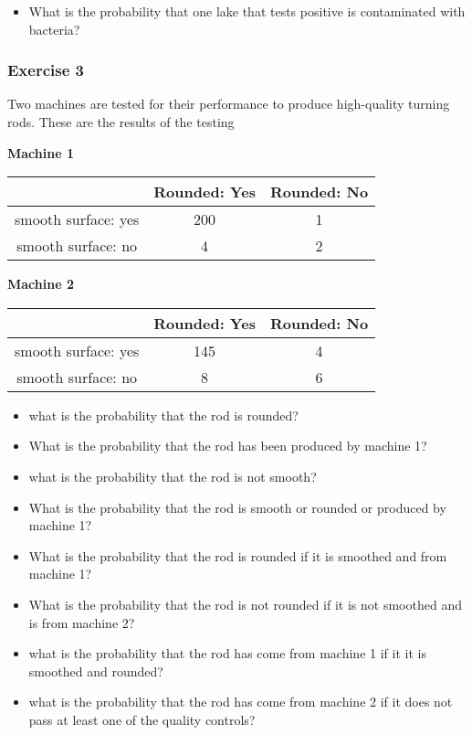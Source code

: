 \documentclass[
]{book}
\providecommand{\tightlist}{%
  \setlength{\itemsep}{0pt}\setlength{\parskip}{0pt}}
\begin{document}
\begin{itemize}
\tightlist
\item
  What is the probability that one lake that tests positive is contaminated with bacteria?
\end{itemize}

\hypertarget{exercise-3}{%
\subsubsection{Exercise 3}\label{exercise-3}}

Two machines are tested for their performance to produce high-quality turning rods. These are the results of the testing

\textbf{Machine 1}

\begin{longtable}[]{@{}ccc@{}}
\toprule
& Rounded: Yes & Rounded: No \\
\midrule
\endhead
smooth surface: yes & 200 & 1 \\
smooth surface: no & 4 & 2 \\
\bottomrule
\end{longtable}

\textbf{Machine 2}

\begin{longtable}[]{@{}ccc@{}}
\toprule
& Rounded: Yes & Rounded: No \\
\midrule
\endhead
smooth surface: yes & 145 & 4 \\
smooth surface: no & 8 & 6 \\
\bottomrule
\end{longtable}

\begin{itemize}
\tightlist
\item
  what is the probability that the rod is rounded?
\item
  What is the probability that the rod has been produced by machine 1?
\item
  what is the probability that the rod is not smooth?
\item
  What is the probability that the rod is smooth or rounded or produced by machine 1?
\item
  What is the probability that the rod is rounded if it is smoothed and from machine 1?
\item
  What is the probability that the rod is not rounded if it is not smoothed and is from machine 2?
\item
  what is the probability that the rod has come from machine 1 if it it is smoothed and rounded?
\item
  what is the probability that the rod has come from machine 2 if it does not pass at least one of the quality controls?
\end{itemize}
\end{document}

